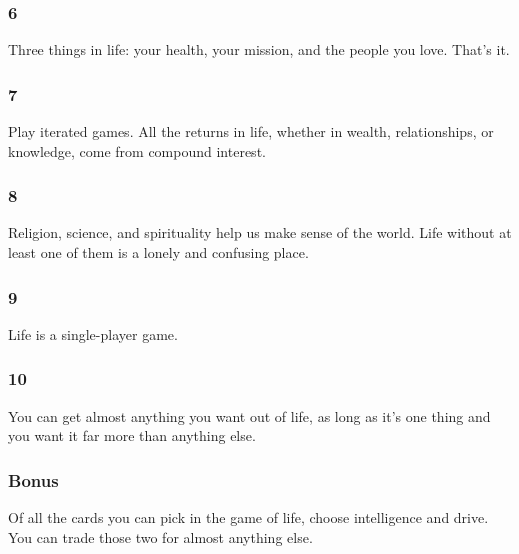 \begin{frame}[fragile]\frametitle{6}
\begin{center}
Three things in life: your health, your mission, and the people you love. That's it.\end{center}
\end{frame}

\begin{frame}[fragile]\frametitle{7}
\begin{center}
Play iterated games. All the returns in life, whether in wealth, relationships, or knowledge, come from compound interest.
\end{center}
\end{frame}

\begin{frame}[fragile]\frametitle{8}
\begin{center}
Religion, science, and spirituality help us make sense of the world. Life without at least one of them is a lonely and confusing place.
\end{center}
\end{frame}

\begin{frame}[fragile]\frametitle{9}
\begin{center}
Life is a single-player game.
\end{center}
\end{frame}


\begin{frame}[fragile]\frametitle{10}
\begin{center}
You can get almost anything you want out of life, as long as it's one thing and you want it far more than anything else.
\end{center}
\end{frame}


\begin{frame}[fragile]\frametitle{Bonus}
\begin{center}
Of all the cards you can pick in the game of life, choose intelligence and drive. You can trade those two for almost anything else.
\end{center}
\end{frame}


